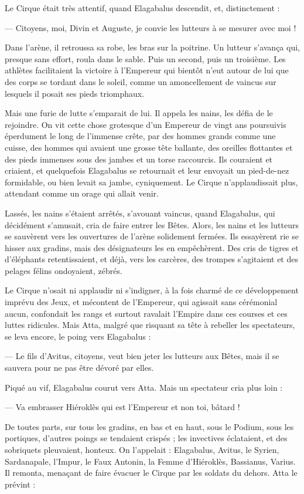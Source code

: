 \documentclass[a4paper, 11pt, oneside, polutonikogreek, french]{article}
\begin{document}
Le Cirque était très attentif, quand Elagabalus descendit, et, distinctement :

--- Citoyens, moi, Divin et Auguste, je convie les lutteurs à se mesurer avec moi !

Dans l'arène, il retroussa sa robe, les bras sur la poitrine. Un lutteur s'avança qui, presque sans effort, roula dans le sable. Puis un second, puis un troisième. Les athlètes facilitaient la victoire à l'Empereur qui bientôt n'eut autour de lui que des corps se tordant dans le soleil, comme un amoncellement de vaincus sur lesquels il posait ses pieds triomphaux.

Mais une furie de lutte s'emparait de lui. Il appela les nains, les défia de le rejoindre. On vit cette chose grotesque d'un Empereur de vingt ans poursuivis éperdument le long de l'immense crête, par des hommes grands comme une cuisse, des hommes qui avaient une grosse tête ballante, des oreilles flottantes et des pieds immenses sous des jambes et un torse raccourcis. Ils couraient et criaient, et quelquefois Elagabalus se retournait et leur envoyait un pied-de-nez formidable, ou bien levait sa jambe, cyniquement. Le Cirque n'applaudissait plus, attendant comme un orage qui allait venir.

Lassés, les nains s'étaient arrêtés, s'avouant vaincus, quand Elagabalus, qui décidément s'amusait, cria de faire entrer les Bêtes. Alors, les nains et les lutteurs se sauvèrent vers les ouvertures de l'arène solidement fermées. Ils essayèrent rie se hisser aux gradins, mais des désignateurs les en empêchèrent. Des cris de tigres et d'éléphants retentissaient, et déjà, vers les carcères, des trompes s'agitaient et des pelages félins ondoyaient, zébrés.

Le Cirque n'osait ni applaudir ni s'indigner, à la fois charmé de ce développement imprévu des Jeux, et mécontent de l'Empereur, qui agissait sans cérémonial aucun, confondait les rangs et surtout ravalait l'Empire dans ces courses et ces luttes ridicules. Mais Atta, malgré que risquant sa tête à rebeller les spectateurs, se leva encore, le poing vers Elagabalus :

--- Le fils d'Avitus, citoyens, veut bien jeter les lutteurs aux Bêtes, mais il se sauvera pour ne pas être dévoré par elles.

Piqué au vif, Elagabalus courut vers Atta. Mais un spectateur cria plus loin :

--- Va embrasser Hiéroklès qui est l'Empereur et non toi, bâtard !

De toutes parts, sur tous les gradins, en bas et en haut, sous le Podium, sous les portiques, d'autres poings se tendaient crispés ; les invectives éclataient, et des sobriquets pleuvaient, honteux. On l'appelait : Elagabalus, Avitus, le Syrien, Sardanapale, l'Impur, le Faux Antonin, la Femme d'Hiéroklès, Bassianus, Varius. Il remonta, menaçant de faire évacuer le Cirque par les soldats du dehors. Atta le prévint :
\end{document}
